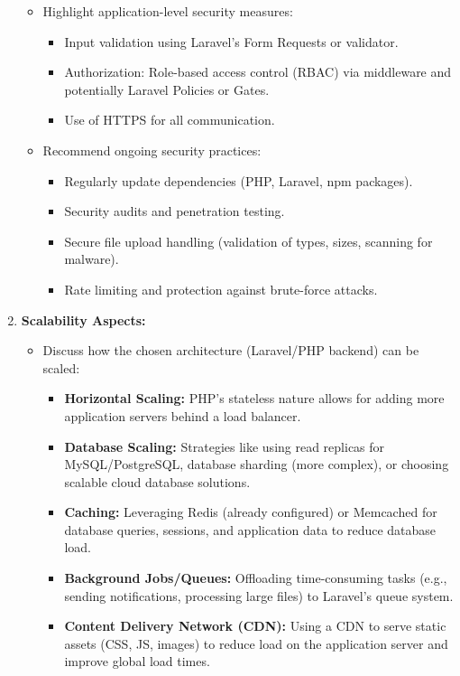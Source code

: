 \documentclass[12pt,a4paper]{article}
\begin{document}
\begin{enumerate}
\begin{itemize}
\begin{itemize}
        \end{itemize}
        \item Highlight application-level security measures:
        \begin{itemize}
            \item Input validation using Laravel's Form Requests or validator.
            \item Authorization: Role-based access control (RBAC) via middleware and potentially Laravel Policies or Gates.
            \item Use of HTTPS for all communication.
        \end{itemize}
        \item Recommend ongoing security practices:
        \begin{itemize}
            \item Regularly update dependencies (PHP, Laravel, npm packages).
            \item Security audits and penetration testing.
            \item Secure file upload handling (validation of types, sizes, scanning for malware).
            \item Rate limiting and protection against brute-force attacks.
        \end{itemize}
    \end{itemize}
    \item \textbf{Scalability Aspects:}
    \begin{itemize}
        \item Discuss how the chosen architecture (Laravel/PHP backend) can be scaled:
        \begin{itemize}
            \item \textbf{Horizontal Scaling:} PHP's stateless nature allows for adding more application servers behind a load balancer.
            \item \textbf{Database Scaling:} Strategies like using read replicas for MySQL/PostgreSQL, database sharding (more complex), or choosing scalable cloud database solutions.
            \item \textbf{Caching:} Leveraging Redis (already configured) or Memcached for database queries, sessions, and application data to reduce database load.
            \item \textbf{Background Jobs/Queues:} Offloading time-consuming tasks (e.g., sending notifications, processing large files) to Laravel's queue system.
            \item \textbf{Content Delivery Network (CDN):} Using a CDN to serve static assets (CSS, JS, images) to reduce load on the application server and improve global load times.

\end{itemize}
\end{itemize}
\end{enumerate}
\end{document}
